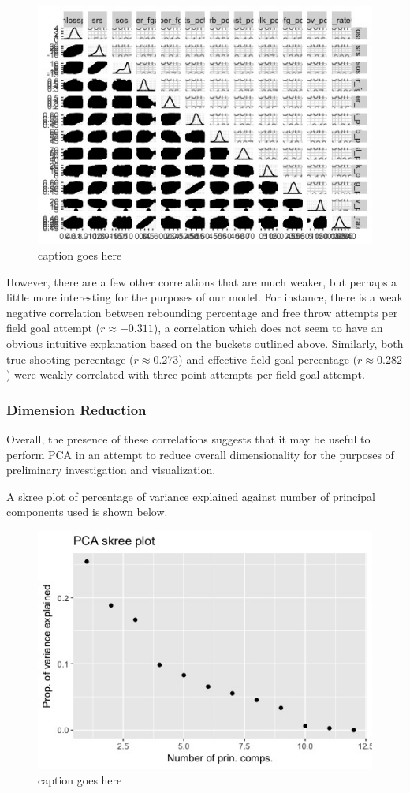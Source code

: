 \documentclass[10pt,a4paper, hidelinks]{article} %
\begin{document}
\begin{figure}[H]
	\centering
	\includegraphics[width=1\linewidth]{../fig/MoneyMaker}
	\caption{caption goes here}
	\label{fig:ggpairs}
\end{figure} 

However, there are a few other correlations that are much weaker, but perhaps a little more interesting for the purposes of our model. For instance, there is a weak negative correlation between rebounding percentage and free throw attempts per field goal attempt ($r \approx -0.311$), a correlation which does not seem to have an obvious intuitive explanation based on the buckets outlined above. Similarly, both true shooting percentage ($r \approx 0.273$) and effective field goal percentage ($r \approx 0.282$) were weakly correlated with three point attempts per field goal attempt.

\subsubsection{Dimension Reduction}

Overall, the presence of these correlations suggests that it may be useful to perform PCA in an attempt to reduce overall dimensionality for the purposes of preliminary investigation and visualization.

A skree plot of percentage of variance explained against number of principal components used is shown below. 

\begin{figure}[H]
	\centering
	\includegraphics[width=0.7\linewidth]{../fig/Skreeeeee}
	\caption{caption goes here}
	\label{fig:Skreeeeee}
\end{figure}
\end{document}
